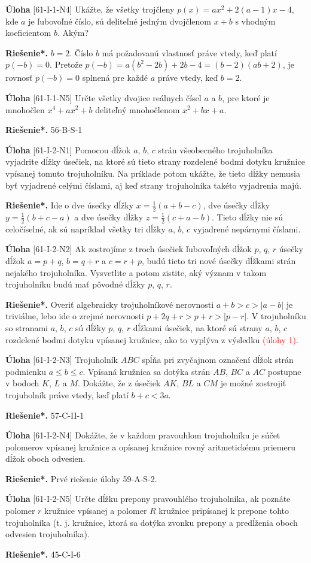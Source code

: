 \documentclass{article}
\newcommand{\rieh}{\textbf{Riešenie*.} }
\newcommand\todo[1]{\noindent\textcolor{red}{(#1)}}
\newcommand{\problem}[3]{
  \begin{tcolorbox}[breakable,notitle,boxrule=0pt,colback=light-gray,colframe=light-gray]
    \textbf{Úloha}
    [#1] #2
  \end{tcolorbox}
  \noindent#3
}
\begin{document}
\problem{61-I-1-N4}{
Ukážte, že všetky trojčleny $p(x) = ax^2+ 2(a - 1)x - 4$, kde $a$ je ľubovoľné číslo, sú deliteľné jedným dvojčlenom $x+b$ s vhodným koeficientom $b$. Akým?
}{
\rieh $b = 2$. Číslo $b$ má požadovanú vlastnosť práve vtedy, keď platí $p(-b) = 0$. Pretože $p(-b) = a(b^2 - 2b)+ 2b - 4 = (b - 2)(ab + 2)$, je rovnosť $p(-b) = 0$ splnená pre každé $a$ práve vtedy, keď $b = 2$.
}


\problem{61-I-1-N5}{
Určte všetky dvojice reálnych čísel $a$ a $b$, pre ktoré je mnohočlen $x^4+ ax^2+ b$ deliteľný
mnohočlenom $x^2+ bx + a$.
}{
\rieh 56-B-S-1
}


\problem{61-I-2-N1}{
Pomocou dĺžok $a$, $b$, $c$ strán všeobecného trojuholníka vyjadrite dĺžky úsečiek, na ktoré sú tieto strany rozdelené bodmi dotyku kružnice vpísanej tomuto trojuholníku. Na príklade potom ukážte, že tieto dĺžky nemusia byť vyjadrené celými číslami, aj keď strany trojuholníka takéto vyjadrenia majú. 
}{
\rieh Ide o dve úsečky dĺžky $x =\frac{1}{2}(a + b - c)$, dve úsečky dĺžky $y =\frac{1}{2}(b + c - a)$ a dve úsečky dĺžky $z =\frac{1}{2}(c + a - b)$. Tieto dĺžky nie sú celočíselné, ak sú napríklad všetky tri dĺžky $a$, $b$, $c$ vyjadrené nepárnymi číslami.
}


\problem{61-I-2-N2}{
Ak zostrojíme z troch úsečiek ľubovoľných dĺžok $p$, $q$, $r$ úsečky dĺžok $a = p+q$, $b = q+r$ a $c = r + p$, budú tieto tri nové úsečky dĺžkami strán nejakého trojuholníka. Vysvetlite a potom zistite, aký význam v takom trojuholníku budú mať pôvodné dĺžky $p$, $q$, $r$.
}{
\rieh Overiť algebraicky trojuholníkové nerovnosti $a + b > c > |a - b|$ je triviálne, lebo ide o zrejmé nerovnosti $p + 2q + r > p + r > |p - r|$. V trojuholníku so stranami $a$, $b$, $c$ sú dĺžky $p$, $q$, $r$ dĺžkami úsečiek, na ktoré sú strany $a$, $b$, $c$ rozdelené bodmi dotyku vpísanej kružnice, ako to vyplýva z výsledku \todo{úlohy 1}.
}


\problem{61-I-2-N3}{
Trojuholník $ABC$ spĺňa pri zvyčajnom označení dĺžok strán podmienku $a \leq  b \leq c$. Vpísaná kružnica sa dotýka strán $AB$, $BC$ a $AC$ postupne v bodoch $K$, $L$ a $M$. Dokážte, že z úsečiek $AK$, $BL$ a $CM$ je možné zostrojiť trojuholník práve vtedy, keď platí $b + c < 3a$. 
}{
\rieh 57-C-II-1
}

\problem{61-I-2-N4}{
Dokážte, že v každom pravouhlom trojuholníku je súčet polomerov vpísanej kružnice a opísanej kružnice rovný aritmetickému priemeru dĺžok oboch odvesien.
}{
\rieh Prvé riešenie úlohy 59-A-S-2.
}

\problem{61-I-2-N5}{
Určte dĺžku prepony pravouhlého trojuholníka, ak poznáte polomer $r$ kružnice vpísanej a polomer $R$ kružnice pripísanej k prepone tohto trojuholníka (t. j. kružnice, ktorá sa dotýka zvonku prepony a predĺženia oboch odvesien trojuholníka). 
}{
\rieh 45-C-I-6
}
\end{document}
